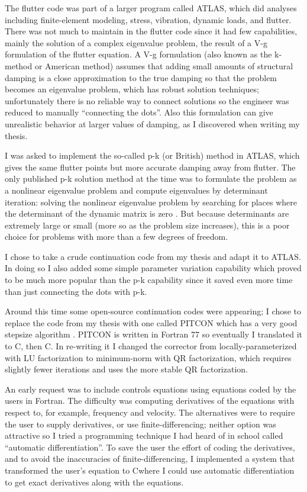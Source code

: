 \documentclass[11pt,openany,twoside]{book}
\numberwithin{equation}{section}		%
\def\Cpp{{C\nolinebreak[4]\hspace{-.05em}\raisebox{.4ex}{\tiny\bf ++}}\:}
\begin{document}
The flutter code was part of a larger program called ATLAS, which did
analyses including finite-element modeling, stress, vibration, dynamic loads,
and flutter. There was not much to maintain in the flutter code since it
had few capabilities, mainly the solution of a complex eigenvalue problem,
the result of a V-g formulation of the flutter equation.
A V-g formulation (also known as the k-method or American method) assumes that
adding small amounts of structural damping is a close approximation to the true damping so that the
problem becomes an eigenvalue problem, which has robust solution techniques;
unfortunately there is no reliable way to connect solutions so the
engineer was reduced to manually ``connecting the dots''. Also this formulation can
give unrealistic behavior at larger values of damping, as I discovered when writing
my thesis.

I was asked to implement the so-called p-k (or British) method in ATLAS, which
gives the same flutter points but more accurate damping away from flutter.
The only published p-k solution method at the time was to formulate
the problem as a nonlinear eigenvalue problem and compute eigenvalues
by determinant iteration:
solving the nonlinear eigenvalue problem by searching for places where
the determinant of the dynamic matrix is zero \cite{hassig1971approximate}.
But because determinants are extremely large or small (more so as the
problem size increases), this is a poor choice for problems with more
than a few degrees of freedom.

I chose to take a crude continuation code from my thesis
\cite{meyer1982aeroelastic} and adapt
it to ATLAS. In doing so I also added some simple parameter variation capability
which proved to be much more popular than the p-k capability since
it saved even more time than just connecting the dots with p-k.

Around this time some open-source continuation codes were appearing;
I chose to replace the code from my thesis with one called PITCON
which has a very good stepsize algorithm \cite{rheinboldt1983algorithm}.
PITCON is written in Fortran 77 so eventually I translated it to C, then
\Cpp. In re-writing it I changed the corrector from locally-parameterized
with LU factorization to minimum-norm with QR factorization, which requires
slightly fewer iterations and uses the more stable QR factorization.

An early request was to include controls equations using equations
coded by the users in Fortran. The difficulty was computing derivatives
of the equations with respect to, for example, frequency and velocity.
The alternatives were to require the user to supply derivatives, or use
finite-differencing; neither option was attractive so I tried a programming
technique I had heard of in school called ``automatic differentiation''.
To save the user the effort of coding the derivatives, and to
avoid the inaccuracies of finite-differencing, I implemented a system
that transformed the user's equation to \Cpp where I could use automatic
differentiation to get exact derivatives along with the equations.
\end{document}
